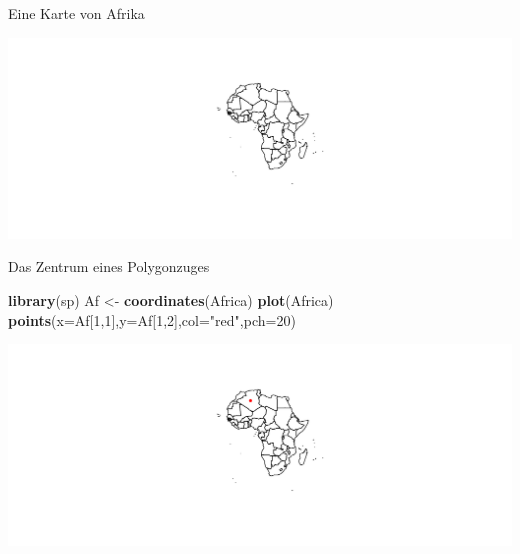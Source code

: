 \documentclass[ignorenonframetext,]{beamer}
\newenvironment{Shaded}{\begin{snugshade}}{\end{snugshade}}
\newcommand{\KeywordTok}[1]{\textcolor[rgb]{0.13,0.29,0.53}{\textbf{#1}}}
\newcommand{\DataTypeTok}[1]{\textcolor[rgb]{0.13,0.29,0.53}{#1}}
\newcommand{\DecValTok}[1]{\textcolor[rgb]{0.00,0.00,0.81}{#1}}
\newcommand{\StringTok}[1]{\textcolor[rgb]{0.31,0.60,0.02}{#1}}
\newcommand{\OperatorTok}[1]{\textcolor[rgb]{0.81,0.36,0.00}{\textbf{#1}}}
\newcommand{\NormalTok}[1]{#1}
\begin{document}
\begin{frame}[fragile]{Eine Karte von Afrika}

\begin{Shaded}
\end{Shaded}

\includegraphics{slides_all2gether_part1_files/figure-beamer/unnamed-chunk-166-1.pdf}

\end{frame}

\begin{frame}[fragile]{Das Zentrum eines Polygonzuges}

\begin{Shaded}
\begin{Highlighting}[]
\KeywordTok{library}\NormalTok{(sp)}
\NormalTok{Af <-}\StringTok{ }\KeywordTok{coordinates}\NormalTok{(Africa)}
\KeywordTok{plot}\NormalTok{(Africa)}
\KeywordTok{points}\NormalTok{(}\DataTypeTok{x=}\NormalTok{Af[}\DecValTok{1}\NormalTok{,}\DecValTok{1}\NormalTok{],}\DataTypeTok{y=}\NormalTok{Af[}\DecValTok{1}\NormalTok{,}\DecValTok{2}\NormalTok{],}\DataTypeTok{col=}\StringTok{"red"}\NormalTok{,}\DataTypeTok{pch=}\DecValTok{20}\NormalTok{)}
\end{Highlighting}
\end{Shaded}

\includegraphics{slides_all2gether_part1_files/figure-beamer/unnamed-chunk-167-1.pdf}

\end{frame}
\end{document}

